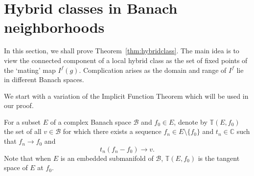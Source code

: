 \documentclass{amsart}
\numberwithin{equation}{section}
\newcommand{\C}{\mathbb C}
\theoremstyle{definition}
\theoremstyle{remark}
\begin{document}
\section{Hybrid classes in Banach neighborhoods}\label{sec:hybridclass}
In this section, we shall prove Theorem~\ref{thm:hybridclass}. The main idea is to view the connected component of a local hybrid class as the set of fixed points of the `mating' map $I^f(g)$. Complication arises as the domain and range of $I^f$ lie in different Banach spaces.  

We start with a variation of the Implicit Function Theorem which will be used in our proof. 

For a subset $E$ of a complex Banach space $\mathcal{B}$ and $f_0\in E$, denote by $\mathbb{T}(E, f_0)$ the set of all $v\in \mathcal{B}$ for which there exists a sequence $f_n\in E\setminus \{f_0\}$ and $t_n\in \C$ such that $f_n\to f_0$ and 
$$t_n(f_n-f_0)\to v.$$
Note that when $E$ is an embedded submanifold of $\mathcal{B}$, $\mathbb{T}(E,f_0)$ is the tangent space of $E$ at $f_0$. 
\end{document}
